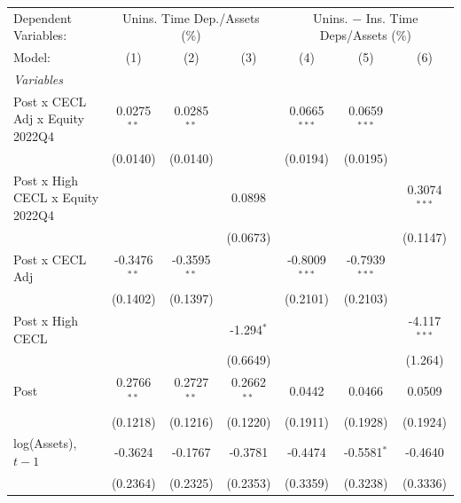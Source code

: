 
\begingroup
\centering
\begin{tabular}{lcccccc}
   \tabularnewline \midrule \midrule
   Dependent Variables: & \multicolumn{3}{c}{Unins. Time Dep./Assets (\%)} & \multicolumn{3}{c}{Unins. $-$ Ins. Time Deps/Assets (\%)}\\
   Model:                           & (1)             & (2)             & (3)             & (4)             & (5)             & (6)\\  
   \midrule
   \emph{Variables}\\
   Post x CECL Adj x Equity 2022Q4  & 0.0275$^{**}$   & 0.0285$^{**}$   &                 & 0.0665$^{***}$  & 0.0659$^{***}$  &   \\   
                                    & (0.0140)        & (0.0140)        &                 & (0.0194)        & (0.0195)        &   \\   
   Post x High CECL x Equity 2022Q4 &                 &                 & 0.0898          &                 &                 & 0.3074$^{***}$\\   
                                    &                 &                 & (0.0673)        &                 &                 & (0.1147)\\   
   Post x CECL Adj                  & -0.3476$^{**}$  & -0.3595$^{**}$  &                 & -0.8009$^{***}$ & -0.7939$^{***}$ &   \\   
                                    & (0.1402)        & (0.1397)        &                 & (0.2101)        & (0.2103)        &   \\   
   Post x High CECL                 &                 &                 & -1.294$^{*}$    &                 &                 & -4.117$^{***}$\\   
                                    &                 &                 & (0.6649)        &                 &                 & (1.264)\\   
   Post                             & 0.2766$^{**}$   & 0.2727$^{**}$   & 0.2662$^{**}$   & 0.0442          & 0.0466          & 0.0509\\   
                                    & (0.1218)        & (0.1216)        & (0.1220)        & (0.1911)        & (0.1928)        & (0.1924)\\   
   log(Assets), $t{-}1$             & -0.3624         & -0.1767         & -0.3781         & -0.4474         & -0.5581$^{*}$   & -0.4640\\   
                                    & (0.2364)        & (0.2325)        & (0.2353)        & (0.3359)        & (0.3238)        & (0.3336)\\   

\end{tabular}
